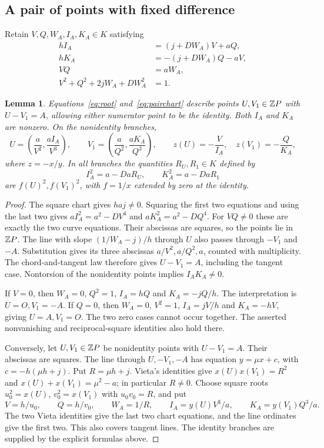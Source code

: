 \documentclass[11pt,a4paper]{article}
\newtheorem{lemma}[theorem]{Lemma}
\begin{document}
\subsection{A pair of points with fixed difference}

Retain $V,Q,W_A,I_A,K_A\in K$ satisfying
\begin{equation}\label{eq:pairchart}
 \begin{split}
 hI_A&=(j+DW_A)V+aQ,\\
 hK_A&=-(j+DW_A)Q-aV,\\
 VQ&=aW_A,\\
 V^2+Q^2+2jW_A+DW_A^2&=1.
 \end{split}
\end{equation}

\begin{lemma}\label{lem:pairchart}
Equations~\eqref{eq:root} and~\eqref{eq:pairchart} describe points
$U,V_1\in\mathbb Z P$ with $U-V_1=A$, allowing either numerator point
to be the identity. Both $I_A$ and $K_A$ are nonzero. On the
nonidentity branches,
\[
 U=\left(\frac a{V^2},\frac{aI_A}{V^3}\right),\qquad
 V_1=\left(\frac a{Q^2},\frac{aK_A}{Q^3}\right),
 \qquad z(U)=-\frac V{I_A},\quad z(V_1)=-\frac Q{K_A},
\]
where $z=-x/y$. In all branches the quantities $R_U,R_1\in K$
defined by
\begin{equation}\label{eq:recipsquares}
             I_A^2=a-DaR_U,\qquad K_A^2=a-DaR_1
\end{equation}
are $f(U)^2,f(V_1)^2$, with $f=1/x$ extended by zero at the identity.
\end{lemma}
\begin{proof}
The square chart gives $haj\ne0$.
Squaring the first two equations and using the last two gives
$aI_A^2=a^2-DV^4$ and $aK_A^2=a^2-DQ^4$.
For $VQ\ne0$ these are exactly the two curve equations. Their
abscissas are squares, so the points lie in $\mathbb Z P$.
The line with slope $(1/W_A-j)/h$ through $U$ also passes through
$-V_1$ and $-A$. Substitution gives its three abscissas
$a/V^2,a/Q^2,a$, counted with multiplicity. The chord-and-tangent
law therefore gives $U-V_1=A$, including the tangent case.
Nontorsion of the nonidentity points implies $I_AK_A\ne0$.

If $V=0$, then $W_A=0$, $Q^2=1$, $I_A=hQ$ and
$K_A=-jQ/h$. The interpretation is $U=O,V_1=-A$.
If $Q=0$, then $W_A=0$, $V^2=1$, $I_A=jV/h$ and
$K_A=-hV$, giving $U=A,V_1=O$. The two zero cases cannot occur
together. The asserted nonvanishing and reciprocal-square identities
also hold there.

Conversely, let $U,V_1\in\mathbb Z P$ be nonidentity points with $U-V_1=A$.
Their abscissas are squares. The line through $U,-V_1,-A$ has equation
$y=\mu x+c$, with $c=-h(\mu h+j)$. Put $R=\mu h+j$.
Vieta's identities give
$x(U)x(V_1)=R^2$ and $x(U)+x(V_1)=\mu^2-a$; in particular $R\ne0$.
Choose square roots $u_0^2=x(U)$, $v_0^2=x(V_1)$ with $u_0v_0=R$,
and put
\[
 V=h/u_0,\qquad Q=h/v_0,\qquad W_A=1/R,\qquad
 I_A=y(U)V^3/a,\qquad K_A=y(V_1)Q^3/a.
\]
The two Vieta identities give the last two chart equations, and the
line ordinates give the first two. This also covers tangent lines.
The identity branches are supplied by the explicit formulas above.
\end{proof}
\end{document}
